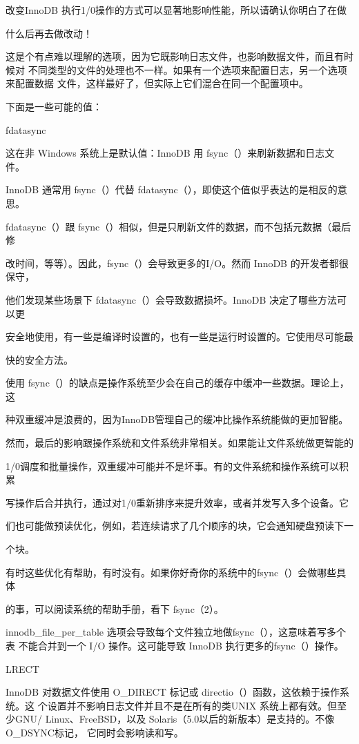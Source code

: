 改变InnoDB 执行1/0操作的方式可以显著地影响性能，所以请确认你明白了在做

什么后再去做改动！

这是个有点难以理解的选项，因为它既影响日志文件，也影响数据文件，而且有时候对
不同类型的文件的处理也不一样。如果有一个选项来配置日志，另一个选项来配置数据
文件，这样最好了，但实际上它们混合在同一个配置项中。

下面是一些可能的值：

fdatasync

这在非 Windows 系统上是默认值：InnoDB 用 fsync（）来刷新数据和日志文件。

InnoDB 通常用 fsync（）代替 fdatasync（），即使这个值似乎表达的是相反的意思。

fdatasync（）跟 fsync（）相似，但是只刷新文件的数据，而不包括元数据（最后修

改时间，等等）。因此，fsync（）会导致更多的I/O。然而 InnoDB 的开发者都很保守，

他们发现某些场景下 fdatasync（）会导致数据损坏。InnoDB 决定了哪些方法可以更

安全地使用，有一些是编译时设置的，也有一些是运行时设置的。它使用尽可能最

快的安全方法。

使用 fsync（）的缺点是操作系统至少会在自己的缓存中缓冲一些数据。理论上，这

种双重缓冲是浪费的，因为InnoDB管理自己的缓冲比操作系统能做的更加智能。

然而，最后的影响跟操作系统和文件系统非常相关。如果能让文件系统做更智能的

1/0调度和批量操作，双重缓冲可能并不是坏事。有的文件系统和操作系统可以积累

写操作后合并执行，通过对1/0重新排序来提升效率，或者并发写入多个设备。它

们也可能做预读优化，例如，若连续请求了几个顺序的块，它会通知硬盘预读下一

个块。

有时这些优化有帮助，有时没有。如果你好奇你的系统中的fsync（）会做哪些具体

的事，可以阅读系统的帮助手册，看下 fsync（2）。

innodb\_file\_per\_table 选项会导致每个文件独立地做fsync（），这意味着写多个表
不能合并到一个 I/O 操作。这可能导致 InnoDB 执行更多的fsync（）操作。

LRECT

InnoDB 对数据文件使用 O\_DIRECT 标记或 directio（）函数，这依赖于操作系统。这
个设置并不影响日志文件并且不是在所有的类UNIX 系统上都有效。但至少GNU/
Linux、FreeBSD，以及 Solaris（5.0以后的新版本）是支持的。不像O\_DSYNC标记，
它同时会影响读和写。


